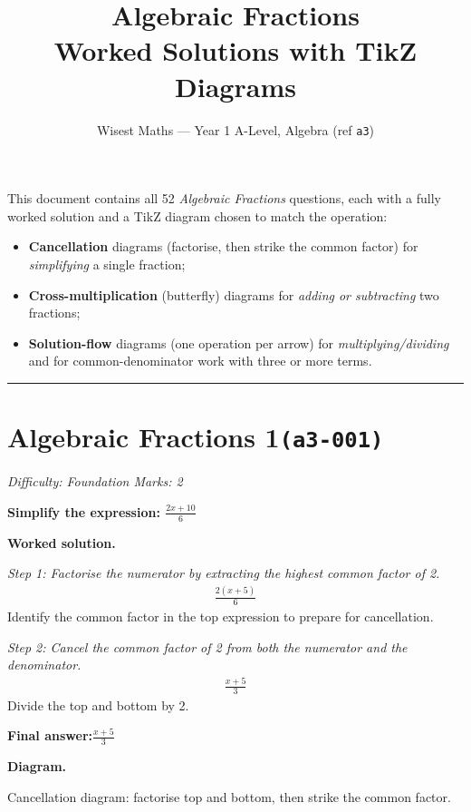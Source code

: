 \documentclass[11pt]{article}
\title{\textbf{Algebraic Fractions}\\[0.3em]\large Worked Solutions with TikZ Diagrams}
\author{Wisest Maths --- Year 1 A-Level, Algebra (ref \texttt{a3})}
\date{}
\newcommand{\question}[1]{\par\medskip\noindent\textbf{#1}\par}
\begin{document}
\maketitle
\noindent This document contains all 52 \emph{Algebraic Fractions} questions, each with a fully
worked solution and a TikZ diagram chosen to match the operation:
\begin{itemize}\setlength{\itemsep}{1pt}
  \item \textbf{Cancellation} diagrams (factorise, then strike the common factor) for \emph{simplifying} a single fraction;
  \item \textbf{Cross-multiplication} (butterfly) diagrams for \emph{adding or subtracting} two fractions;
  \item \textbf{Solution-flow} diagrams (one operation per arrow) for \emph{multiplying/dividing} and for common-denominator work with three or more terms.
\end{itemize}
\tableofcontents
\bigskip
\hrule

\section*{Algebraic Fractions 1\quad\small\texttt{(a3-001)}}
\textit{Difficulty: Foundation \quad\textbar\quad Marks: 2}

\question{Simplify the expression: \( \frac{2x+10}{6} \)}

\textbf{Worked solution.}

\textit{Step 1: Factorise the numerator by extracting the highest common factor of 2.}
\[\begin{gathered}
\frac{2(x + 5)}{6}
\end{gathered}\]
Identify the common factor in the top expression to prepare for cancellation.

\textit{Step 2: Cancel the common factor of 2 from both the numerator and the denominator.}
\[\begin{gathered}
\frac{x + 5}{3}
\end{gathered}\]
Divide the top and bottom by 2.

\begin{answerbox}
\textbf{Final answer:}\quad \(\displaystyle \frac{x + 5}{3}\)
\end{answerbox}
\textbf{Diagram.}

\begin{center}
\end{center}
\small Cancellation diagram: factorise top and bottom, then strike the common factor.\normalsize
\end{document}
